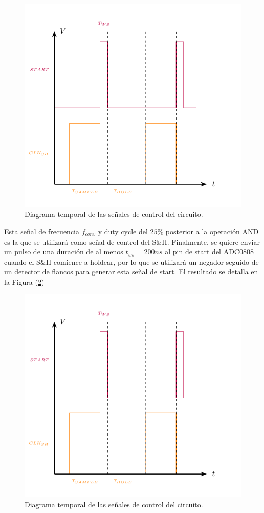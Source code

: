 \begin{figure}[H]
\centering
\includegraphics[width=0.7\linewidth, page = 2]{ImagenesEjercicio1/Graficos.pdf}
\caption{Diagrama temporal de las señales de control del circuito.}
\label{DT}
\end{figure}

Esta señal de frecuencia $f_{conv}$ y duty cycle del $25\%$ posterior a la operación AND es la que se utilizará como señal de control del S\&H. Finalmente, se quiere enviar un pulso de una duración de al menos $t_{ws} = 200ns$ al pin de start del ADC0808 cuando el S\&H comience a holdear, por lo que se utilizará un negador seguido de un detector de flancos para generar esta señal de start. El resultado se detalla en la Figura (\ref{START})

\begin{figure}[H]
\centering
\includegraphics[width=0.6\linewidth]{ImagenesEjercicio1/Graficos.pdf}
\caption{Diagrama temporal de las señales de control del circuito.}
\label{START}
\end{figure}

